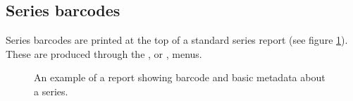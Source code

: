 
\subsection{Series barcodes}

Series barcodes are printed at the top of a standard series report (see figure \ref{fig:seriesreport}).  These are produced through the , or , menus.  

\begin{figure}[p]
  \centering
    \setlength\fboxsep{0pt}
    \setlength\fboxrule{0.5pt}
    \caption{An example of a report showing barcode and basic metadata about a series.  }
    \label{fig:seriesreport}
\end{figure}


